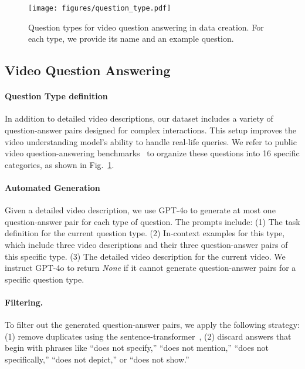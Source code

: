 \begin{figure}[t!]
    \centering
    \texttt{[image: figures/question\_type.pdf]}
    \caption{Question types for video question answering in data creation. For each type, we provide its name and an example question.}
 \label{fig:question_type}
\end{figure}

\subsection{Video Question Answering}
\paragraph{Question Type definition}
In addition to detailed video descriptions, our dataset includes a variety of question-answer pairs designed for complex interactions. This setup improves the video understanding model's ability to handle real-life queries. We refer to public video question-answering benchmarks~\citep{xiao2021next,yu2019activityqa,Khattak2024cvrres,liu2024tempcompass} to organize these questions into 16 specific categories, as shown in Fig.~\ref{fig:question_type}.

\paragraph{Automated Generation}
Given a detailed video description, we use GPT-4o to generate at most one question-answer pair for each type of question. The prompts include: (1) The task definition for the current question type. (2) In-context examples for this type, which include three video descriptions and their three question-answer pairs of this specific type. (3) The detailed video description for the current video.
We instruct GPT-4o to return \textit{None} if it cannot generate question-answer pairs for a specific question type.

\paragraph{Filtering.}
To filter out the generated question-answer pairs, we apply the following strategy: (1) remove duplicates using the sentence-transformer~\citep{reimers-2020-multilingual-sentence-bert}, (2) discard answers that begin with phrases like ``does not specify,'' ``does not mention,'' ``does not specifically,'' ``does not depict,'' or ``does not show.''

